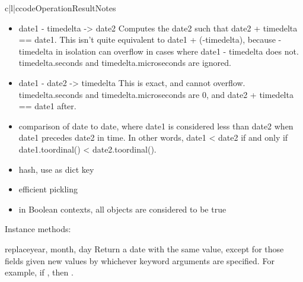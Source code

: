 \begin{tableiii}{c|l|c}{code}{Operation}{Result}{Notes}
\begin{itemize}
  \item
    date1 - timedelta -> date2
    Computes the date2 such that date2 + timedelta == date1.  This
    isn't quite equivalent to date1 + (-timedelta), because -timedelta
    in isolation can overflow in cases where date1 - timedelta does
    not.  timedelta.seconds and timedelta.microseconds are ignored.

  \item
    date1 - date2 -> timedelta
    This is exact, and cannot overflow.  timedelta.seconds and
    timedelta.microseconds are 0, and date2 + timedelta == date1
    after.

  \item
    comparison of date to date, where date1 is considered less than
    date2 when date1 precedes date2 in time.  In other words,
    date1 < date2 if and only if date1.toordinal() < date2.toordinal().

  \item
    hash, use as dict key

  \item
    efficient pickling

  \item
    in Boolean contexts, all  objects are considered to be true
\end{itemize}

Instance methods:

\begin{methoddesc}{replace}{year, month, day}
    Return a date with the same value, except for those fields given
    new values by whichever keyword arguments are specified.  For
    example, if , then
    .
\end{methoddesc}


\end{tableiii}

